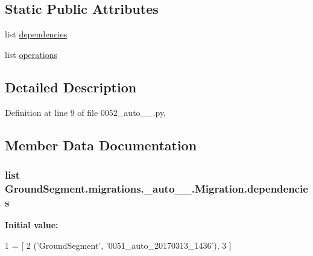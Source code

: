 \subsection*{Static Public Attributes}
\begin{DoxyCompactItemize}
\item 
list \hyperlink{class_ground_segment_1_1migrations_1_10052__auto__20170324__2213_1_1_migration_aa47c5eb3dfe2728c78097703a0d569b8}{dependencies}
\item 
list \hyperlink{class_ground_segment_1_1migrations_1_10052__auto__20170324__2213_1_1_migration_a7dce325482e5bfb146dc4bcfebd76b67}{operations}
\end{DoxyCompactItemize}


\subsection{Detailed Description}


Definition at line 9 of file 0052\+\_\+auto\+\_\+\_.\+py.



\subsection{Member Data Documentation}
\hypertarget{class_ground_segment_1_1migrations_1_10052__auto__20170324__2213_1_1_migration_aa47c5eb3dfe2728c78097703a0d569b8}{}
\subsubsection[{dependencies}]{\setlength{\rightskip}{0pt plus 5cm}list Ground\+Segment.\+migrations.\+\_\+auto\+\_\+\_.\+Migration.\+dependencies\hspace{0.3cm}{\ttfamily [static]}}\label{class_ground_segment_1_1migrations_1_10052__auto__20170324__2213_1_1_migration_aa47c5eb3dfe2728c78097703a0d569b8}
{\bfseries Initial value\+:}
\begin{DoxyCode}
1 = [
2         (\textcolor{stringliteral}{'GroundSegment'}, \textcolor{stringliteral}{'0051\_auto\_20170313\_1436'}),
3     ]
\end{DoxyCode}


